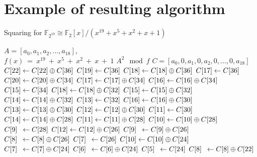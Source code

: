 \documentclass{ufscThesis}
\newcommand{\F}{\mathbb{F}}
\newcommand{\mathbox}[3][l]{\makebox[\widthof{$#2$}][#1]{$#3$}}
\begin{document}



\appendix

\section{Example of resulting algorithm}
\label{appendix:example}

\begin{algorithm}
\caption{Squaring for $\F_{2^{19}} \cong \F_2[x]/(x^{19} + x^5 + x^2 + x + 1)$}
\label{alg:square:example}
\begin{multicols}{2}
\begin{algorithmic}[1]
\REQUIRE $A = [a_0, a_1, a_2, ..., a_{18}]$, \\$f(x)~=~x^{19}~+~x^5~+~x^2~+~x~+~1$
\ENSURE $A^2 \mod f$
\STATE $C = [a_0, 0, a_1, 0, a_2, 0, \ldots, 0, a_{18}]$
\STATE $\mathbox{C[22]}{C[22]} \leftarrow C[22]  \oplus  C[36]$
\STATE $\mathbox{C[22]}{C[19]} \leftarrow C[36]$
\STATE $\mathbox{C[22]}{C[18]} \leftarrow C[18]  \oplus  C[36]$
\STATE $\mathbox{C[22]}{C[17]} \leftarrow C[36]$
\STATE $\mathbox{C[22]}{C[20]} \leftarrow C[20]  \oplus  C[34]$
\STATE $\mathbox{C[22]}{C[17]} \leftarrow C[17]  \oplus  C[34]$
\STATE $\mathbox{C[22]}{C[16]} \leftarrow C[16]  \oplus  C[34]$
\STATE $\mathbox{C[22]}{C[15]} \leftarrow C[34]$
\STATE $\mathbox{C[22]}{C[18]} \leftarrow C[18]  \oplus  C[32]$
\STATE $\mathbox{C[22]}{C[15]} \leftarrow C[15]  \oplus  C[32]$
\STATE $\mathbox{C[22]}{C[14]} \leftarrow C[14]  \oplus  C[32]$
\STATE $\mathbox{C[22]}{C[13]} \leftarrow C[32]$
\STATE $\mathbox{C[22]}{C[16]} \leftarrow C[16]  \oplus  C[30]$
\STATE $\mathbox{C[22]}{C[13]} \leftarrow C[13]  \oplus  C[30]$
\STATE $\mathbox{C[22]}{C[12]} \leftarrow C[12]  \oplus  C[30]$
\STATE $\mathbox{C[22]}{C[11]} \leftarrow C[30]$
\STATE $\mathbox{C[22]}{C[14]} \leftarrow C[14]  \oplus  C[28]$
\STATE $\mathbox{C[22]}{C[11]} \leftarrow C[11]  \oplus  C[28]$
\STATE $\mathbox{C[22]}{C[10]} \leftarrow C[10]  \oplus  C[28]$
\STATE $\mathbox{C[22]}{C[9]} \leftarrow C[28]$
\STATE $\mathbox{C[22]}{C[12]} \leftarrow C[12]  \oplus  C[26]$
\STATE $\mathbox{C[22]}{C[9]} \leftarrow C[9]  \oplus  C[26]$
\STATE $\mathbox{C[22]}{C[8]} \leftarrow C[8]  \oplus  C[26]$
\STATE $\mathbox{C[22]}{C[7]} \leftarrow C[26]$
\STATE $\mathbox{C[22]}{C[10]} \leftarrow C[10]  \oplus  C[24]$
\STATE $\mathbox{C[22]}{C[7]} \leftarrow C[7]  \oplus  C[24]$
\STATE $\mathbox{C[22]}{C[6]} \leftarrow C[6]  \oplus  C[24]$
\STATE $\mathbox{C[22]}{C[5]} \leftarrow C[24]$
\STATE $\mathbox{C[22]}{C[8]} \leftarrow C[8]  \oplus  C[22]$

\end{algorithmic}
\end{multicols}
\end{algorithm}
\end{document}
